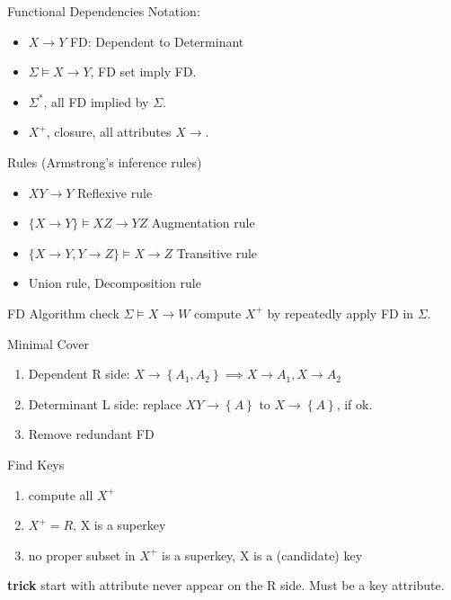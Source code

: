 \documentclass[a4paper]{article}
\begin{document}
\begin{cheatsheetblock}{ Functional Dependencies}
    Notation:
    \begin{itemize}
        \item $X \rightarrow Y$ \hfill FD: Dependent to Determinant
        \item $\Sigma \models X \rightarrow Y$, \hfill FD set imply FD.
        \item $\Sigma^*$, \hfill all FD implied by $\Sigma$.
        \item $X^+$, \hfill closure, all attributes $X \rightarrow$.
    \end{itemize}
    Rules (Armstrong’s inference rules)
    \begin{itemize}
        \item $X Y \rightarrow Y$ \hfill Reﬂexive rule
        \item $\{X \rightarrow Y\} \models X Z \rightarrow Y Z$ \hfill Augmentation rule
        \item $\{X \rightarrow Y, Y \rightarrow Z\} \models X \rightarrow Z$ \hfill Transitive rule
        \item Union rule, Decomposition rule
    \end{itemize}
\end{cheatsheetblock}

\begin{cheatsheetblock}{FD Algorithm}
    check $\Sigma \models X \rightarrow W$ \hfill compute $X^+$ by repeatedly apply FD in $\Sigma$.
\end{cheatsheetblock}

\begin{cheatsheetblock}{Minimal Cover}
    \begin{enumerate}
        \item Dependent R side: $X \rightarrow\left\{A_1, A_2\right\} \implies X \rightarrow A_1, X \rightarrow A_2$
        \item Determinant L side: replace $XY \rightarrow \left\{A\right\}$ to $X \rightarrow \left\{A\right\}$, if ok.
        \item Remove redundant FD
    \end{enumerate}
\end{cheatsheetblock}

\begin{cheatsheetblock}{Find Keys}
    \begin{enumerate}
        \item compute all $X^+$
        \item $X^+ = R$, X is a superkey
        \item no proper subset in $X^+$ is a superkey, X is a (candidate) key
    \end{enumerate}

    \textbf{trick}
    start with attribute never appear on the R side. Must be a key attribute.
\end{cheatsheetblock}
\end{document}
